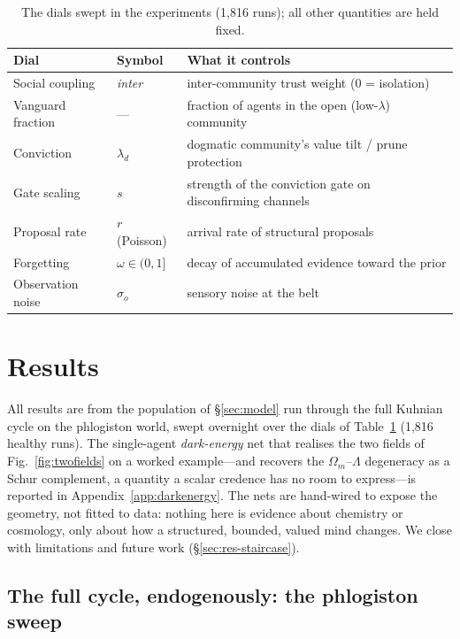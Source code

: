 \documentclass[11pt]{article}
\begin{document}
\begin{table}[h!]
\centering\footnotesize
\begin{tabular}{lll}
\hline
Dial & Symbol & What it controls \\
\hline
Social coupling & \emph{inter} & inter-community trust weight (0 = isolation) \\
Vanguard fraction & --- & fraction of agents in the open (low-$\lambda$) community \\
Conviction & $\lambda_d$ & dogmatic community's value tilt / prune protection \\
Gate scaling & $s$ & strength of the conviction gate on disconfirming channels \\
Proposal rate & $r$ (Poisson) & arrival rate of structural proposals \\
Forgetting & $\omega\in(0,1]$ & decay of accumulated evidence toward the prior \\
Observation noise & $\sigma_o$ & sensory noise at the belt \\
\hline
\end{tabular}
\caption{The dials swept in the experiments (1{,}816 runs); all other quantities are held fixed.}
\label{tab:dials}
\end{table}

\section{Results}
\label{sec:results}

All results are from the population of \S\ref{sec:model} run through the full Kuhnian cycle on the
phlogiston world, swept overnight over the dials of Table~\ref{tab:dials} (1{,}816 healthy runs).
The single-agent \emph{dark-energy} net that realises the two fields of Fig.~\ref{fig:twofields} on
a worked example---and recovers the $\Omega_m$--$\Lambda$ degeneracy as a Schur complement, a
quantity a scalar credence has no room to express---is reported in Appendix~\ref{app:darkenergy}.
The nets are hand-wired to expose the geometry, not fitted to data: nothing here is evidence about
chemistry or cosmology, only about how a structured, bounded, valued mind changes. We close with
limitations and future work (\S\ref{sec:res-staircase}).

\subsection{The full cycle, endogenously: the phlogiston sweep}
\label{sec:res-kuhn}
\end{document}
